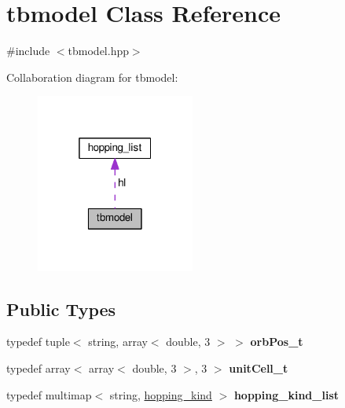 \hypertarget{classtbmodel}{}\section{tbmodel Class Reference}
\label{classtbmodel}


{\ttfamily \#include $<$tbmodel.\+hpp$>$}



Collaboration diagram for tbmodel\+:\nopagebreak
\begin{figure}[H]
\begin{center}
\leavevmode
\includegraphics[width=148pt]{classtbmodel__coll__graph}
\end{center}
\end{figure}
\subsection*{Public Types}
\begin{DoxyCompactItemize}
\item 
typedef tuple$<$ string, array$<$ double, 3 $>$ $>$ {\bfseries orb\+Pos\+\_\+t}\hypertarget{classtbmodel_a76dca7d0eb27c0a04cbde93974ae68e8}{}\label{classtbmodel_a76dca7d0eb27c0a04cbde93974ae68e8}

\item 
typedef array$<$ array$<$ double, 3 $>$, 3 $>$ {\bfseries unit\+Cell\+\_\+t}\hypertarget{classtbmodel_a34391d0e7eca0f75360009c5898b8d02}{}\label{classtbmodel_a34391d0e7eca0f75360009c5898b8d02}

\item 
typedef multimap$<$ string, \hyperlink{classhopping__kind}{hopping\+\_\+kind} $>$ {\bfseries hopping\+\_\+kind\+\_\+list}\hypertarget{classtbmodel_ab2715f3f60cd388612806e79e233748c}{}\label{classtbmodel_ab2715f3f60cd388612806e79e233748c}

\end{DoxyCompactItemize}
